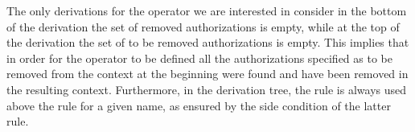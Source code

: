 The only derivations for the operator we are interested in consider in the bottom of the derivation the set of removed authorizations is empty, while at the top of the derivation the set of to be removed authorizations is empty. This implies that in order for the operator to be defined all the authorizations specified as to be removed from the context at the beginning were found and have been removed in the resulting context.
Furthermore, in the derivation tree, the rule  is always used above the rule  for a given name, as ensured by the side condition of the latter rule.



